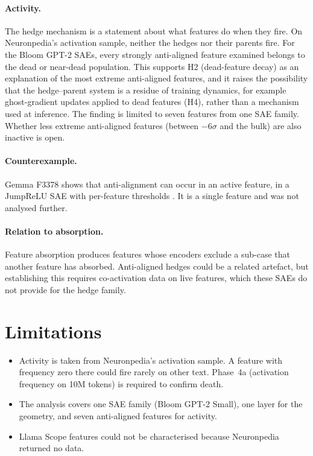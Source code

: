 \documentclass[11pt,a4paper]{article}
\begin{document}
\paragraph{Activity.} The hedge mechanism is a statement about what features do when they fire. On Neuronpedia's activation sample, neither the hedges nor their parents fire. For the Bloom GPT-2 SAEs, every strongly anti-aligned feature examined belongs to the dead or near-dead population. This supports H2 (dead-feature decay) as an explanation of the most extreme anti-aligned features, and it raises the possibility that the hedge--parent system is a residue of training dynamics, for example ghost-gradient updates applied to dead features (H4), rather than a mechanism used at inference. The finding is limited to seven features from one SAE family. Whether less extreme anti-aligned features (between $-6\sigma$ and the bulk) are also inactive is open.

\paragraph{Counterexample.} Gemma F3378 shows that anti-alignment can occur in an active feature, in a JumpReLU SAE with per-feature thresholds \citep{lieberum2024}. It is a single feature and was not analysed further.

\paragraph{Relation to absorption.} Feature absorption \citep{chanin2024absorption} produces features whose encoders exclude a sub-case that another feature has absorbed. Anti-aligned hedges could be a related artefact, but establishing this requires co-activation data on live features, which these SAEs do not provide for the hedge family.

\section{Limitations}

\begin{itemize}[noitemsep]
  \item Activity is taken from Neuronpedia's activation sample. A feature with frequency zero there could fire rarely on other text. Phase~4a (activation frequency on 10M tokens) is required to confirm death.
  \item The analysis covers one SAE family (Bloom GPT-2 Small), one layer for the geometry, and seven anti-aligned features for activity.
  \item Llama Scope features could not be characterised because Neuronpedia returned no data.
\end{itemize}
\end{document}

